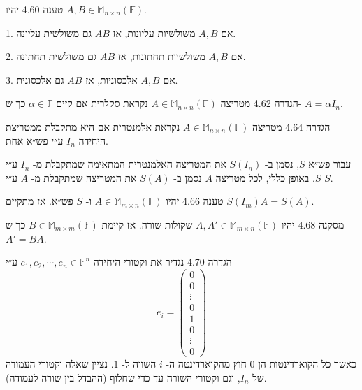 \documentclass[a4paper, 11pt]{article}
\begin{document}
\begin{envbox}[thmcolor]{טענה 4.60}
יהיו $A,B\in\mathbb{M}_{n\times n}(\mathbb{F})$.

1.  אם $A,B$ משולשיות עליונות, אז $AB$ גם משולשית עליונה.

2.  אם $A,B$ משולשיות תחתונות, אז $AB$ גם משולשית תחתונה.

3.  אם $A,B$ אלכסוניות, אז $AB$ גם אלכסונית.
\end{envbox}

\begin{envbox}[defcolor]{הגדרה 4.62}
מטריצה $A\in\mathbb{M}_{n\times n}(\mathbb{F})$ נקראת סקלרית אם קיים $\alpha\in\mathbb{F}$ כך ש- $A=\alpha I_n$.
\end{envbox}

\begin{envbox}[defcolor]{הגדרה 4.64}
מטריצה $A\in\mathbb{M}_{n\times n}(\mathbb{F})$ נקראת אלמנטרית אם היא מתקבלת ממטריצת היחידה $I_n$ ע״י פש״א אחת.

עבור פש״א $S$, נסמן ב- $S(I_n)$ את המטריצה האלמנטרית המתאימה שמתקבלת מ- $I_n$ ע״י $S$. באופן כללי, לכל מטריצה $A$ נסמן ב- $S(A)$ את המטריצה שמתקבלת מ- $A$ ע״י $S$.
\end{envbox}

\begin{envbox}[thmcolor]{טענה 4.66}
יהיו $A\in\mathbb{M}_{m\times n}(\mathbb{F})$ ו- $S$ פש״א. אז מתקיים $S(I_m)A=S(A)$.
\end{envbox}

\begin{envbox}[thmcolor]{מסקנה 4.68}
יהיו $A,A'\in\mathbb{M}_{m\times n}(\mathbb{F})$ שקולות שורה. אז קיימת $B\in\mathbb{M}_{m\times m}(\mathbb{F})$ כך ש- $A'=BA$.
\end{envbox}

\begin{envbox}[defcolor]{הגדרה 4.70}
נגדיר את וקטורי היחידה $e_1,e_2,\cdots,e_n\in\mathbb{F}^n$ ע״י 
\[
e_i=\begin{pmatrix}
0 \\
0 \\
\vdots \\
0 \\
1 \\
0\\
\vdots \\
0
\end{pmatrix}
\]
 כאשר כל הקוארדינטות הן $0$ חוץ מהקוארדינטה ה- $i$ השווה ל- $1$. נציין שאלה וקטורי העמודה של $I_n$, וגם וקטורי השורה עד כדי שחלוף (ההבדל בין שורה לעמודה).
\end{envbox}
\end{document}
